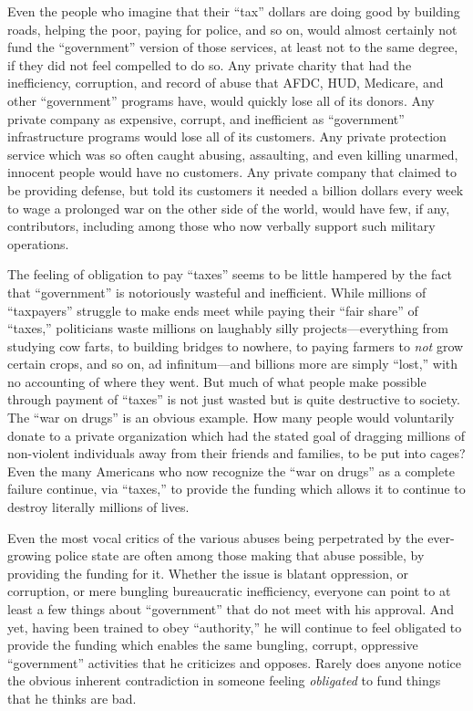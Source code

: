 \documentclass{book}
\begin{document}
Even the people who imagine that their \enquote{tax} dollars are doing good by building roads, helping the poor, paying for police, and so on, would almost certainly not fund the \enquote{government} version of those services, at least not to the same degree, if they did not feel compelled to do so. Any private charity that had the inefficiency, corruption, and record of abuse that AFDC, HUD, Medicare, and other \enquote{government} programs have, would quickly lose all of its donors. Any private company as expensive, corrupt, and inefficient as \enquote{government} infrastructure programs would lose all of its customers. Any private protection service which was so often caught abusing, assaulting, and even killing unarmed, innocent people would have no customers. Any private company that claimed to be providing defense, but told its customers it needed a billion dollars every week to wage a prolonged war on the other side of the world, would have few, if any, contributors, including among those who now verbally support such military operations.

The feeling of obligation to pay \enquote{taxes} seems to be little hampered by the fact that \enquote{government} is notoriously wasteful and inefficient. While millions of \enquote{taxpayers} struggle to make ends meet while paying their \enquote{fair share} of \enquote{taxes,} politicians waste millions on laughably silly projects---everything from studying cow farts, to building bridges to nowhere, to paying farmers to \emph{not} grow certain crops, and so on, ad infinitum---and billions more are simply \enquote{lost,} with no accounting of where they went. But much of what people make possible through payment of \enquote{taxes} is not just wasted but is quite destructive to society. The \enquote{war on drugs} is an obvious example. How many people would voluntarily donate to a private organization which had the stated goal of dragging millions of non-violent individuals away from their friends and families, to be put into cages? Even the many Americans who now recognize the \enquote{war on drugs} as a complete failure continue, via \enquote{taxes,} to provide the funding which allows it to continue to destroy literally millions of lives.

Even the most vocal critics of the various abuses being perpetrated by the ever-growing police state are often among those making that abuse possible, by providing the funding for it. Whether the issue is blatant oppression, or corruption, or mere bungling bureaucratic inefficiency, everyone can point to at least a few things about \enquote{government} that do not meet with his approval. And yet, having been trained to obey \enquote{authority,} he will continue to feel obligated to provide the funding which enables the same bungling, corrupt, oppressive \enquote{government} activities that he criticizes and opposes. Rarely does anyone notice the obvious inherent contradiction in someone feeling \emph{obligated} to fund things that he thinks are bad.
\end{document}
